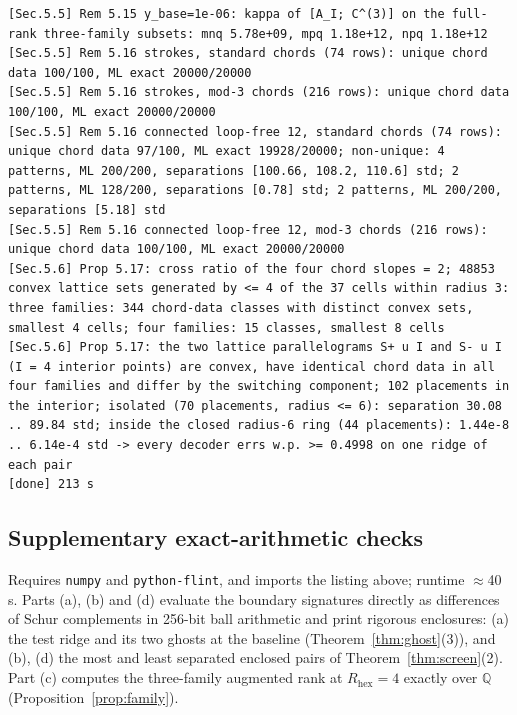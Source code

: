 \documentclass[11pt,a4paper]{article}
\theoremstyle{definition}
\theoremstyle{remark}
\begin{document}
\begin{lstlisting}[style=consolestyle]
[Sec.5.5] Rem 5.15 y_base=1e-06: kappa of [A_I; C^(3)] on the full-rank three-family subsets: mnq 5.78e+09, mpq 1.18e+12, npq 1.18e+12
[Sec.5.5] Rem 5.16 strokes, standard chords (74 rows): unique chord data 100/100, ML exact 20000/20000
[Sec.5.5] Rem 5.16 strokes, mod-3 chords (216 rows): unique chord data 100/100, ML exact 20000/20000
[Sec.5.5] Rem 5.16 connected loop-free 12, standard chords (74 rows): unique chord data 97/100, ML exact 19928/20000; non-unique: 4 patterns, ML 200/200, separations [100.66, 108.2, 110.6] std; 2 patterns, ML 128/200, separations [0.78] std; 2 patterns, ML 200/200, separations [5.18] std
[Sec.5.5] Rem 5.16 connected loop-free 12, mod-3 chords (216 rows): unique chord data 100/100, ML exact 20000/20000
[Sec.5.6] Prop 5.17: cross ratio of the four chord slopes = 2; 48853 convex lattice sets generated by <= 4 of the 37 cells within radius 3: three families: 344 chord-data classes with distinct convex sets, smallest 4 cells; four families: 15 classes, smallest 8 cells
[Sec.5.6] Prop 5.17: the two lattice parallelograms S+ u I and S- u I (I = 4 interior points) are convex, have identical chord data in all four families and differ by the switching component; 102 placements in the interior; isolated (70 placements, radius <= 6): separation 30.08 .. 89.84 std; inside the closed radius-6 ring (44 placements): 1.44e-8 .. 6.14e-4 std -> every decoder errs w.p. >= 0.4998 on one ridge of each pair
[done] 213 s
\end{lstlisting}

\subsection{Supplementary exact-arithmetic checks}\label{app:supp}
Requires \texttt{numpy} and \texttt{python-flint}, and imports the listing above; runtime $\approx$40 s. Parts (a), (b) and (d) evaluate the boundary signatures directly as differences of Schur complements in 256-bit ball arithmetic and print rigorous enclosures: (a) the test ridge and its two ghosts at the baseline (Theorem~\ref{thm:ghost}(3)), and (b), (d) the most and least separated enclosed pairs of Theorem~\ref{thm:screen}(2). Part (c) computes the three-family augmented rank at $R_{\text{hex}} = 4$ exactly over $\mathbb{Q}$ (Proposition~\ref{prop:family}).
\end{document}
